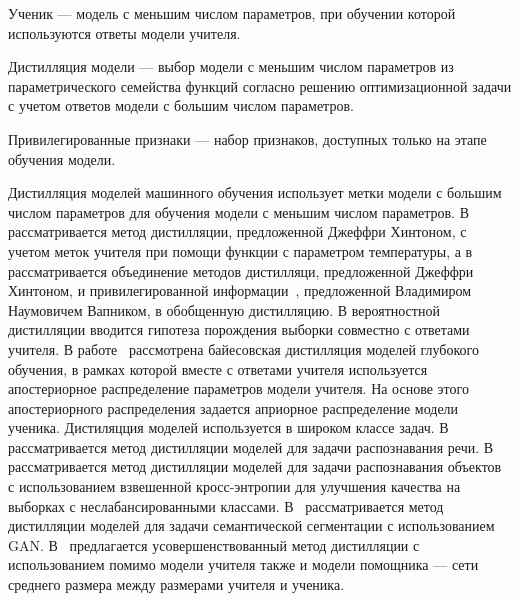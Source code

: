 \begin{definition}
Ученик --- модель с меньшим числом параметров, при обучении которой используются ответы модели учителя.
\end{definition}

\begin{definition}
Дистилляция модели --- выбор модели с меньшим числом параметров из параметрического семейства функций согласно решению оптимизационной задачи с учетом ответов модели с большим числом параметров.
\end{definition}

\begin{definition}
Привилегированные признаки --- набор признаков, доступных только на этапе обучения модели.
\end{definition}

Дистилляция моделей машинного обучения использует метки модели с большим числом параметров для обучения модели с меньшим числом параметров. В~\cite{Hinton2015} рассматривается метод дистилляции, предложенной Джеффри Хинтоном, с учетом меток учителя при помощи функции  с параметром температуры, а в~\cite{Vapnik2016} рассматривается объединение методов дистилляци, предложенной Джеффри Хинтоном, и привилегированной информации~\cite{Vapnik2016}, предложенной Владимиром Наумовичем Вапником, в обобщенную дистилляцию. В вероятностной дистилляции вводится гипотеза порождения выборки совместно с ответами учителя. В работе~\cite{Grabovoy2021} рассмотрена байесовская дистилляция моделей глубокого обучения, в рамках которой вместе с ответами учителя используется апостериорное распределение параметров модели учителя. На основе этого апостериорного распределения задается априорное распределение модели ученика. Дистиляцция моделей используется в широком классе задач. В~\cite{MDASR} рассматривается метод дистилляции моделей для задачи распознавания речи. В~\cite{Object Detection} рассматривается метод дистилляции моделей для задачи распознавания объектов с использованием взвешенной кросс-энтропии для улучшения качества на выборках с неслабансированными классами. В~\cite{Semantic Segmentation} рассматривается метод дистилляции моделей для задачи семантической сегментации с использованием GAN. В~\cite{Improved Distillation} предлагается усовершенствованный метод дистилляции с использованием помимо модели учителя также и модели помощника --- сети среднего размера между размерами учителя и ученика.

